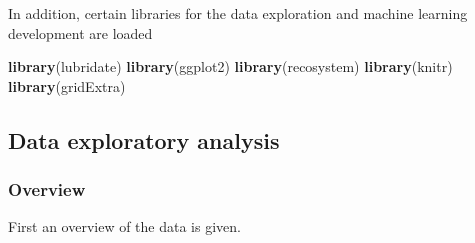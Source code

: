 \documentclass[
]{article}
\newenvironment{Shaded}{\begin{snugshade}}{\end{snugshade}}
\newcommand{\CommentTok}[1]{\textcolor[rgb]{0.56,0.35,0.01}{\textit{#1}}}
\newcommand{\DataTypeTok}[1]{\textcolor[rgb]{0.13,0.29,0.53}{#1}}
\newcommand{\DecValTok}[1]{\textcolor[rgb]{0.00,0.00,0.81}{#1}}
\newcommand{\FloatTok}[1]{\textcolor[rgb]{0.00,0.00,0.81}{#1}}
\newcommand{\KeywordTok}[1]{\textcolor[rgb]{0.13,0.29,0.53}{\textbf{#1}}}
\newcommand{\NormalTok}[1]{#1}
\newcommand{\OperatorTok}[1]{\textcolor[rgb]{0.81,0.36,0.00}{\textbf{#1}}}
\newcommand{\OtherTok}[1]{\textcolor[rgb]{0.56,0.35,0.01}{#1}}
\newcommand{\StringTok}[1]{\textcolor[rgb]{0.31,0.60,0.02}{#1}}
\begin{document}
\begin{Shaded}
\end{Shaded}

In addition, certain libraries for the data exploration and machine
learning development are loaded

\begin{Shaded}
\begin{Highlighting}[]
\KeywordTok{library}\NormalTok{(lubridate)}
\KeywordTok{library}\NormalTok{(ggplot2)}
\KeywordTok{library}\NormalTok{(recosystem)}
\KeywordTok{library}\NormalTok{(knitr)}
\KeywordTok{library}\NormalTok{(gridExtra)}
\end{Highlighting}
\end{Shaded}

\hypertarget{data-exploratory-analysis}{%
\subsection{Data exploratory analysis}\label{data-exploratory-analysis}}

\hypertarget{overview}{%
\subsubsection{Overview}\label{overview}}

First an overview of the data is given.
\end{document}
